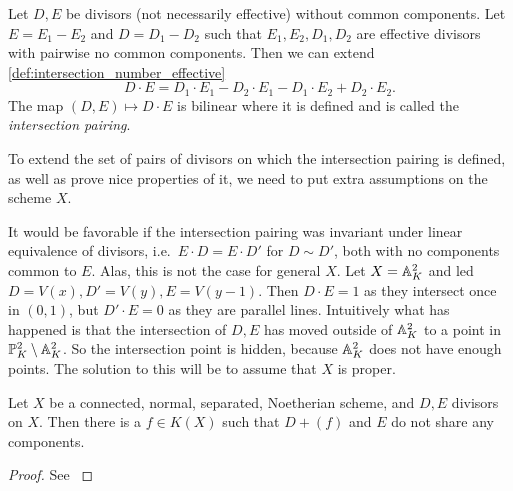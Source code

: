 \begin{definition}
	Let $D, E$ be divisors (not necessarily effective) without common components. 
	Let $E = E_1 - E_2$ and $D = D_1 - D_2$ such that $E_1, E_2, D_1, D_2$ are effective divisors with pairwise no common components. 
	Then we can extend \cref{def:intersection_number_effective} 
	\[
	D\cdot E = D_1 \cdot E_1 - D_2 \cdot E_1 - D_1 \cdot E_2 + D_2 \cdot  E_2
	.\] 
	The map $(D, E )\mapsto D\cdot E$ is bilinear where it is defined and is called the \emph{intersection pairing}.
\end{definition}

To extend the set of pairs of divisors on which the intersection pairing is defined, as well as prove nice properties of it, we need to put extra assumptions on the scheme $X$. 
\begin{example}\label{ex:fail_intersection_pairing_linear}
	It would be favorable if the intersection pairing was invariant under linear equivalence of divisors, i.e.\ $E\cdot D = E\cdot D'$ for $D \sim D'$, both with no components common to $E$. 
	Alas, this is not the case for general $X$. 
	Let $X = \mathbb{A}_K^{2}$ and led $D = V(x), D' = V(y), E = V(y-1)$. 
	Then $D\cdot E = 1$ as they intersect once in $(0, 1)$, but $D' \cdot E = 0$ as they are parallel lines. 
	Intuitively what has happened is that the intersection of $D, E$ has moved outside of $\mathbb{A}_K^2$ to a point in $\mathbb{P}^{2}_K \setminus \mathbb{A}_{K}^2$. 
	So the intersection point is hidden, because $\mathbb{A}_K^2$ does not have enough points. 
	The solution to this will be to assume that $X$ is proper. 
\end{example}


\begin{lemma}\label{lem:moving_lemma}
	Let $X$ be a connected, normal, separated, Noetherian scheme, and $D, E$ divisors on $X$. 
	Then there is a $f \in K(X)$ such that $D + (f)$ and $E$ do not share any components. 
\end{lemma}
\begin{proof}
	See \cite[cor.\ 9.1.10]{liuAlgebraicGeometryArithmetic2002}
\end{proof}

